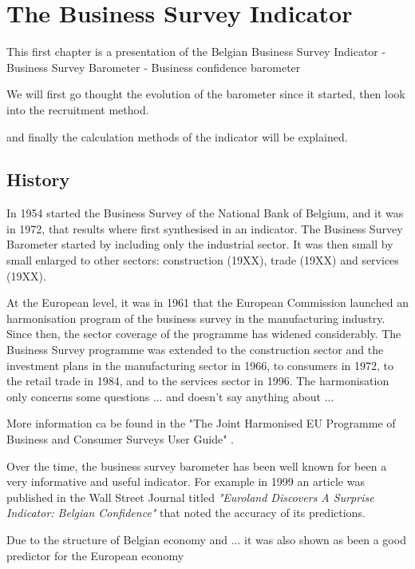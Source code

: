 \documentclass[12pt,a4paper,oneside]{book}
\begin{document}
\lipsum[5]


\chapter{The Business Survey Indicator}

This first chapter is a presentation of the Belgian 
Business Survey Indicator
- Business Survey Barometer
- Business confidence barometer

We will first go thought the evolution of the barometer since it started, then look into the recruitment method.

and finally the calculation methods of the indicator will be explained.

\section{History}

In 1954 started the Business Survey of the National Bank of Belgium, and it was in 1972, that results where first synthesised in an indicator.
The Business Survey Barometer started by including only the industrial sector. It was then small by small enlarged to other sectors: construction (19XX), trade (19XX) and services (19XX).

At the European level, it was in 1961 that the European Commission launched an harmonisation program of the business survey in the manufacturing industry. 
Since then, the sector coverage of the programme has widened considerably. The Business Survey programme was extended to the construction sector and the investment plans in the manufacturing sector in 1966, to consumers in 1972, to the retail trade in 1984, and to the services sector in 1996.
The harmonisation only concerns some questions ... and doesn't say anything about ...

More information ca be found in the "The Joint Harmonised EU Programme of Business and Consumer Surveys User Guide" \cite{european_commission_joint_2016}.

Over the time, the business survey barometer has been well known for been a very informative and useful indicator. For example in 1999 an article was published in the Wall Street Journal titled \textit{"Euroland Discovers A Surprise Indicator: Belgian Confidence"} \citep{rhoads_euroland_1999} that noted the accuracy of its predictions.

Due to the structure of Belgian economy and ... it was also shown as been a good predictor for the European economy \cite{vanhaelen_belgian_2000}
\end{document}
